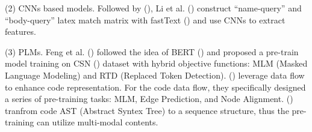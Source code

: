 (2) CNNs based models. Followed by (\citealp{DeepCS}), Li et al. (\citealp{CQIL}) construct “name-query” 
and “body-query” latex match matrix with fastText (\citealp{fastText}) and use 
CNNs to extract features.  

(3) PLMs. Feng et al. (\citealp{CodeBERT}) followed the idea of BERT (\citealp{BERT}) 
and proposed a pre-train model training on CSN (\citealp{CodeSearchNet}) 
dataset with hybrid objective functions: MLM (Masked Language Modeling) 
and RTD (Replaced Token Detection). (\citealp{GraphCodeBERT}) leverage data flow to 
enhance code representation. 
For the code data flow, they specifically designed a series of pre-training tasks: 
MLM, Edge Prediction, and Node Alignment. (\citealp{UniXcoder}) 
tranfrom code AST (Abstract Syntex Tree) to a sequence structure, 
thus the pre-training can utilize multi-modal contents. 







